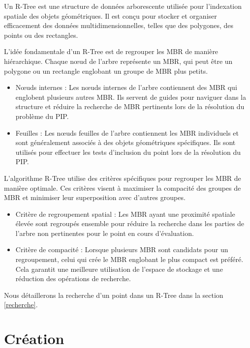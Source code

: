 \documentclass {article}
\begin{document}
Un R-Tree est une structure de données arborescente utilisée pour l'indexation spatiale des 
objets géométriques. Il est conçu pour stocker et organiser efficacement des données 
multidimensionnelles, telles que des polygones, des points ou des rectangles.

L'idée fondamentale d'un R-Tree est de regrouper les MBR de manière hiérarchique. 
Chaque nœud de l'arbre représente un MBR, qui peut être un polygone ou un rectangle englobant 
un groupe de MBR plus petits.
\begin{itemize}

    \item Nœuds internes : Les nœuds internes de l'arbre contiennent des MBR qui englobent 
	plusieurs autres MBR. 
	Ils servent de guides pour naviguer dans la structure et réduire la recherche de MBR 
	pertinents lors de la résolution du problème du PIP.

    \item Feuilles : Les nœuds feuilles de l'arbre contiennent les MBR individuels et sont 
	généralement associés à des objets géométriques spécifiques. 
	Ils sont utilisés pour effectuer les tests d'inclusion du point lors de	la résolution 
	du PIP.
\end{itemize}

L'algorithme R-Tree utilise des critères spécifiques pour regrouper les MBR de manière optimale. 
Ces critères visent à maximiser la compacité des groupes de MBR et minimiser leur superposition 
avec d'autres groupes.

\begin{itemize}
    \item Critère de regroupement spatial : Les MBR ayant une proximité spatiale élevée sont 
	regroupés ensemble pour réduire la recherche dans les parties de l'arbre non pertinentes 
	pour le point en cours d'évaluation.

    \item Critère de compacité : Lorsque plusieurs MBR sont candidats pour un regroupement, 
	celui qui crée le MBR englobant le plus compact est préféré. 
	Cela garantit une meilleure utilisation de l'espace de stockage et une réduction des 
	opérations de recherche.

\end{itemize}
Nous détaillerons la recherche d'un point dans un R-Tree dans la section \ref{recherche}.

\section {Création}
\end{document}
